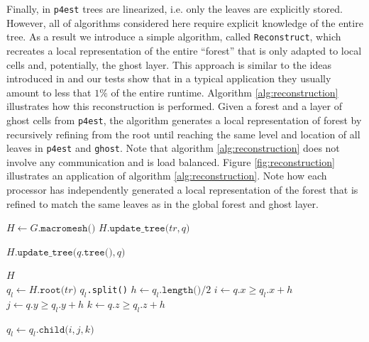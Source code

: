 Finally, in \texttt{p4est} trees are linearized, i.e. only the leaves are explicitly stored. However, all of algorithms considered here require explicit knowledge of the entire tree. As a result we introduce a simple algorithm, called \texttt{Reconstruct}, which recreates a local representation of the entire ``forest'' that is only adapted to local cells and, potentially, the ghost layer. This approach is similar to the ideas introduced in \cite{Bangerth;Burstedde;Heister;etal:11:Algorithms-and-data-} and our tests show that in a typical application they usually amount to less that $1\%$ of the entire runtime. Algorithm \ref{alg:reconstruction} illustrates how this reconstruction is performed. Given a forest and a layer of ghost cells from \texttt{p4est}, the algorithm generates a local representation of forest by recursively refining from the root until reaching the same level and location of all leaves in \texttt{p4est} and \texttt{ghost}. Note that algorithm \ref{alg:reconstruction} does not involve any communication and is load balanced. Figure \ref{fig:reconstruction} illustrates an application of algorithm \ref{alg:reconstruction}. Note how each processor has independently generated a local representation of the forest that is refined to match the same leaves as in the global forest and ghost layer.
\begin{algorithm}[htbp]
\caption{$H \gets \texttt{Reconstruct (}G\texttt{)}$}\label{euclid}
\begin{algorithmic}[1]
\State $H \gets G.\texttt{macromesh()}$
 
		\State $H.\texttt{update\_tree(} tr, q \texttt{)}$
	\EndFor
\EndFor

 
	\State $H.\texttt{update\_tree(} q.\texttt{tree()}, q \texttt{)}$
\EndFor

\State \Return $H$
\\
   
	\State $q_l \gets H.\texttt{root(}tr\texttt{)}$
		 $q_l$\texttt{.split()}
		\EndIf
		\State $h \gets q_l.\texttt{length()} / 2$ 
		\State $i \gets q.x \ge q_l.x + h$
		\State $j \gets q.y \ge q_l.y + h$
		\State $k \gets q.z \ge q_l.z + h$

		\State $q_l \gets q_l.\texttt{child(} i, j, k \texttt{)}$
	\EndWhile	
\EndFunction
\end{algorithmic}
\label{alg:reconstruction}
\end{algorithm}

